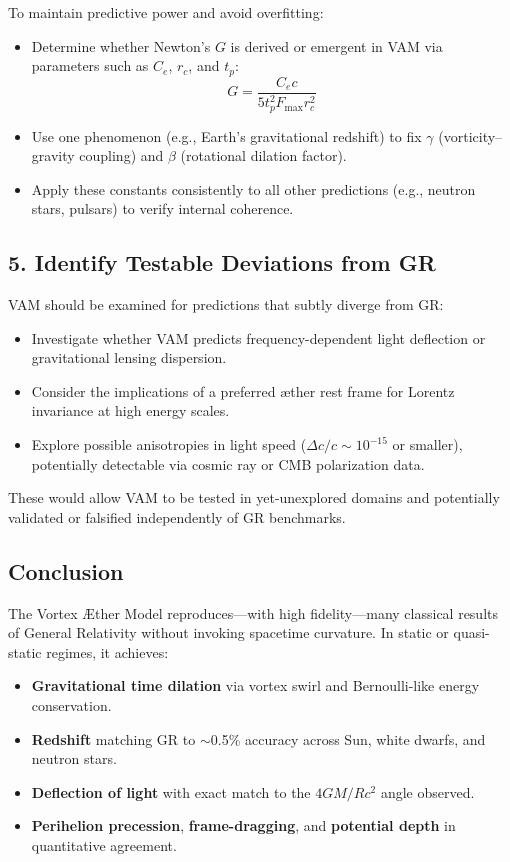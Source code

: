 To maintain predictive power and avoid overfitting:

\begin{itemize}
    \item Determine whether Newton’s $G$ is derived or emergent in VAM via parameters such as $C_e$, $r_c$, and $t_p$:
    \begin{equation}
        G = \frac{C_e c}{5 t_p^2 F_{\max} r_c^2}
    \end{equation}
    \item Use one phenomenon (e.g., Earth’s gravitational redshift) to fix $\gamma$ (vorticity–gravity coupling) and $\beta$ (rotational dilation factor).
    \item Apply these constants consistently to all other predictions (e.g., neutron stars, pulsars) to verify internal coherence.
\end{itemize}

\subsection*{5. Identify Testable Deviations from GR}

VAM should be examined for predictions that subtly diverge from GR:

\begin{itemize}
    \item Investigate whether VAM predicts frequency-dependent light deflection or gravitational lensing dispersion.
    \item Consider the implications of a preferred æther rest frame for Lorentz invariance at high energy scales.
    \item Explore possible anisotropies in light speed ($\Delta c/c \sim 10^{-15}$ or smaller), potentially detectable via cosmic ray or CMB polarization data.
\end{itemize}

These would allow VAM to be tested in yet-unexplored domains and potentially validated or falsified independently of GR benchmarks.

\subsection*{Conclusion}

The Vortex Æther Model reproduces—with high fidelity—many classical results of General Relativity without invoking spacetime curvature. In static or quasi-static regimes, it achieves:

\begin{itemize}
    \item \textbf{Gravitational time dilation} via vortex swirl and Bernoulli-like energy conservation.
    \item \textbf{Redshift} matching GR to $\sim$0.5\% accuracy across Sun, white dwarfs, and neutron stars.
    \item \textbf{Deflection of light} with exact match to the $4GM/Rc^2$ angle observed.
    \item \textbf{Perihelion precession}, \textbf{frame-dragging}, and \textbf{potential depth} in quantitative agreement.
\end{itemize}

